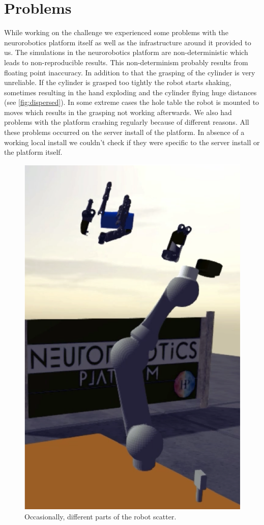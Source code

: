 \section{Problems}\label{sec:problems}
While working on the challenge we experienced some problems with the neurorobotics platform itself as well as the infrastructure around it provided to us.
The simulations in the neurorobotics platform are non-deterministic which leads to non-reproducible results.
This non-determinism probably results from floating point inaccuracy.
In addition to that the grasping of the cylinder is very unreliable.
If the cylinder is grasped too tightly the robot starts shaking, sometimes resulting in the hand exploding and the cylinder flying huge distances (see \autoref{fig:dispersed}).
In some extreme cases the hole table the robot is mounted to moves which results in the grasping not working afterwards.
We also had problems with the platform crashing regularly because of different reasons.
All these problems occurred on the server install of the platform.
In absence of a working local install we couldn't check if they were specific to the server install or the platform itself.

\begin{figure}[h]
\centering
\includegraphics[width=.95\columnwidth]{figures/dispersed_robot.png}
\caption{Occasionally, different parts of the robot scatter.}
\label{fig:dispersed}
\end{figure}